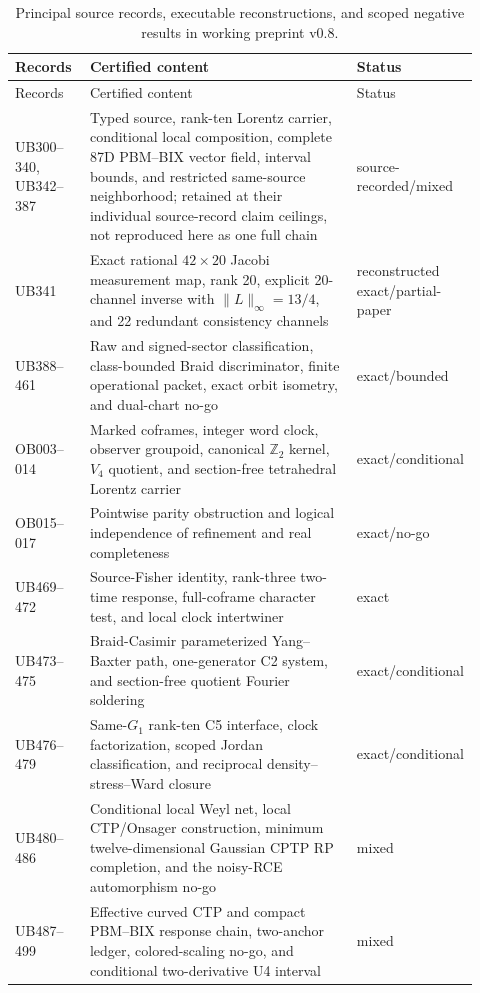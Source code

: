 \documentclass[11pt]{article}
\theoremstyle{definition}
\theoremstyle{remark}
\begin{document}
\begin{longtable}{@{}p{0.16\linewidth}p{0.58\linewidth}p{0.18\linewidth}@{}}
\caption{Principal source records, executable reconstructions, and scoped negative results in working preprint v0.8.}\label{tab:certificates}\\
\toprule
Records & Certified content & Status\\
\midrule
\endfirsthead
\toprule
Records & Certified content & Status\\
\midrule
\endhead
UB300--340, UB342--387 & Typed source, rank-ten Lorentz carrier, conditional local composition, complete 87D PBM--BIX vector field, interval bounds, and restricted same-source neighborhood; retained at their individual source-record claim ceilings, not reproduced here as one full chain & source-recorded/mixed\\
UB341 & Exact rational $42\times20$ Jacobi measurement map, rank 20, explicit 20-channel inverse with $\|L\|_\infty=13/4$, and 22 redundant consistency channels & reconstructed exact/partial-paper\\
UB388--461 & Raw and signed-sector classification, class-bounded Braid discriminator, finite operational packet, exact orbit isometry, and dual-chart no-go & exact/bounded\\
OB003--014 & Marked coframes, integer word clock, observer groupoid, canonical $\mathbb Z_2$ kernel, $V_4$ quotient, and section-free tetrahedral Lorentz carrier & exact/conditional\\
OB015--017 & Pointwise parity obstruction and logical independence of refinement and real completeness & exact/no-go\\
UB469--472 & Source-Fisher identity, rank-three two-time response, full-coframe character test, and local clock intertwiner & exact\\
UB473--475 & Braid-Casimir parameterized Yang--Baxter path, one-generator C2 system, and section-free quotient Fourier soldering & exact/conditional\\
UB476--479 & Same-$G_1$ rank-ten C5 interface, clock factorization, scoped Jordan classification, and reciprocal density--stress--Ward closure & exact/conditional\\
UB480--486 & Conditional local Weyl net, local CTP/Onsager construction, minimum twelve-dimensional Gaussian CPTP RP completion, and the noisy-RCE automorphism no-go & mixed\\
UB487--499 & Effective curved CTP and compact PBM--BIX response chain, two-anchor ledger, colored-scaling no-go, and conditional two-derivative U4 interval & mixed\\

\end{longtable}
\end{document}
